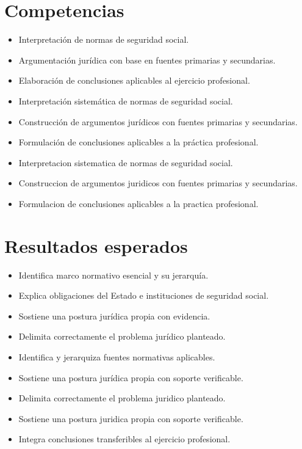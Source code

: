 \documentclass[12pt]{article}
\begin{document}
\section*{Competencias}
\begin{itemize}[leftmargin=*]
  \item Interpretación de normas de seguridad social.
  \item Argumentación jurídica con base en fuentes primarias y secundarias.
  \item Elaboración de conclusiones aplicables al ejercicio profesional.
  \item Interpretación sistemática de normas de seguridad social.
  \item Construcción de argumentos jurídicos con fuentes primarias y secundarias.
  \item Formulación de conclusiones aplicables a la práctica profesional.
  \item Interpretacion sistematica de normas de seguridad social.
  \item Construccion de argumentos juridicos con fuentes primarias y secundarias.
  \item Formulacion de conclusiones aplicables a la practica profesional.
\end{itemize}

\section*{Resultados esperados}
\begin{itemize}[leftmargin=*]
  \item Identifica marco normativo esencial y su jerarquía.
  \item Explica obligaciones del Estado e instituciones de seguridad social.
  \item Sostiene una postura jurídica propia con evidencia.
  \item Delimita correctamente el problema jurídico planteado.
  \item Identifica y jerarquiza fuentes normativas aplicables.
  \item Sostiene una postura jurídica propia con soporte verificable.
  \item Delimita correctamente el problema juridico planteado.
  \item Sostiene una postura juridica propia con soporte verificable.
  \item Integra conclusiones transferibles al ejercicio profesional.
\end{itemize}
\end{document}
